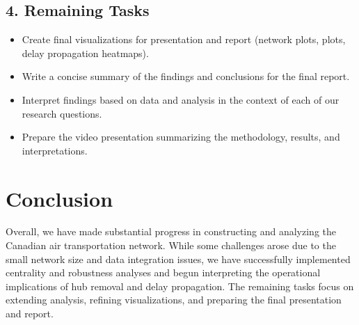 \documentclass[11pt]{article}
\begin{document}
\subsection*{4. Remaining Tasks}
\begin{itemize}[leftmargin=*]
    \item Create final visualizations for presentation and report (network plots, plots, delay propagation heatmaps).
    \item Write a concise summary of the findings and conclusions for the final report.
    \item Interpret findings based on data and analysis in the context of each of our research questions.
    \item Prepare the video presentation summarizing the methodology, results, and interpretations.
\end{itemize}

\section*{Conclusion}
Overall, we have made substantial progress in constructing and analyzing the Canadian air transportation network. While some challenges arose due to the small network size and data integration issues, we have successfully implemented centrality and robustness analyses and begun interpreting the operational implications of hub removal and delay propagation. The remaining tasks focus on extending analysis, refining visualizations, and preparing the final presentation and report.
\end{document}
